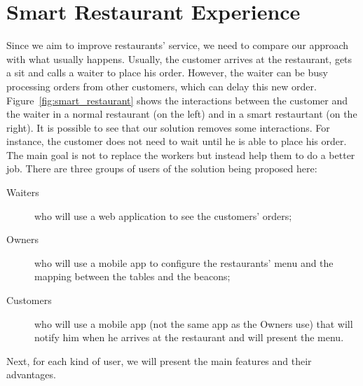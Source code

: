 
\section{Smart Restaurant Experience}
\label{sec:smart_restaurant_experience}

Since we aim to improve restaurants' service, we need to compare our approach
with what usually happens.
Usually, the customer arrives at the restaurant, gets a sit and calls a waiter
to place his order. However, the waiter can be busy processing orders
from other customers, which can delay this new order.
Figure~\ref{fig:smart_restaurant} shows the interactions between the
customer and the waiter in a normal restaurant (on the left) and in
a smart restaurtant (on the right). It is possible to see that our
solution removes some interactions. For instance, the customer does not
need to wait until he is able to place his order.
The main goal is not to replace the workers but instead help them to do a
better job.
There are three groups of users of the solution being proposed here:

\begin{description}
  \item[Waiters] who will use a web application to see the customers'
  orders;
  \item[Owners] who will use a mobile app to configure the
  restaurants' menu and the mapping between the tables and the beacons;
  \item[Customers] who will use a mobile app (not the same app as the
  Owners use) that will notify him when he arrives at the restaurant and
  will present the menu.
\end{description}

Next, for each kind of user, we will present the main features and their
advantages.

